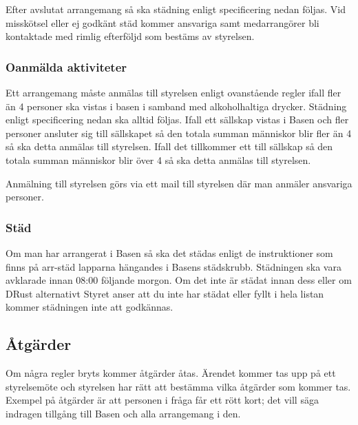 Efter avslutat arrangemang så ska städning enligt specificering nedan följas. Vid misskötsel eller ej godkänt städ kommer ansvariga samt medarrangörer bli kontaktade med rimlig efterföljd som bestäms av styrelsen.

\subsubsection{Oanmälda aktiviteter}
Ett arrangemang måste anmälas till styrelsen enligt ovanstående regler ifall fler än 4 personer
ska vistas i basen i samband med alkoholhaltiga drycker. Städning enligt specificering nedan ska alltid följas.
Ifall ett sällskap vistas i Basen och fler personer ansluter sig till sällskapet så den totala
summan människor blir fler än 4 så ska detta anmälas till styrelsen. Ifall det tillkommer ett
till sällskap så den totala summan människor blir över 4 så ska detta anmälas till styrelsen.

Anmälning till styrelsen görs via ett mail till styrelsen där man anmäler ansvariga personer.

\subsubsection{Städ}
Om man har arrangerat i Basen så ska det städas enligt de instruktioner som finns på arr-städ lapparna hängandes i Basens städskrubb. Städningen ska vara avklarade innan 08:00 följande morgon. Om det inte är städat innan dess eller om DRust alternativt Styret anser att du inte har städat eller fyllt i hela listan kommer städningen inte att godkännas.

\subsection{Åtgärder}
Om några regler bryts kommer åtgärder åtas. Ärendet kommer tas upp på ett styrelsemöte och styrelsen har rätt att bestämma vilka åtgärder som kommer tas. Exempel på åtgärder är att personen i fråga får ett rött kort; det vill säga indragen tillgång till Basen och alla arrangemang i den.